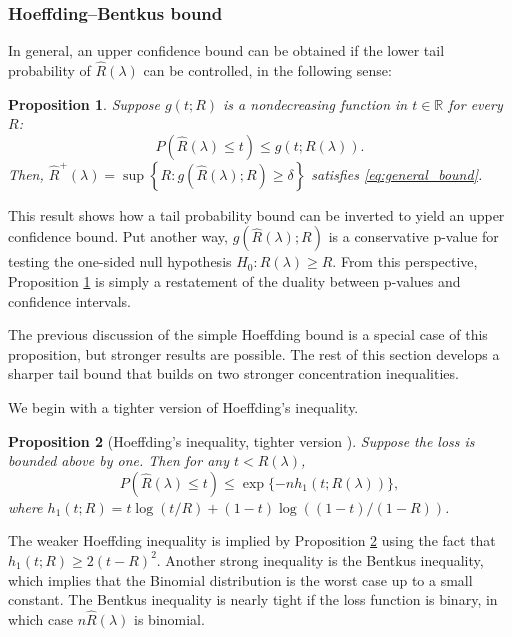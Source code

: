 \documentclass[10pt]{article}
\newtheorem{prop}{Proposition}
\newcommand{\Rhat}{\widehat{R}}
\begin{document}
\subsubsection{Hoeffding--Bentkus bound}
\label{sec:hbb}
In general, an upper confidence bound can be obtained if the lower tail probability of $\widehat{R}(\lambda)$ can be controlled, in the following sense:
\begin{prop}\label{prop:generic}
Suppose $g(t; R)$ is a nondecreasing function in $t\in \mathbb{R}$ for every $R$:
\begin{equation}\label{eq:generic}
P(\widehat{R}(\lambda)\le t)\le g(t; R(\lambda)).
\end{equation}
Then, $\widehat{R}^{+}(\lambda) = \sup\left\{R: g(\widehat{R}(\lambda); R)\ge \delta\right\}$ satisfies \eqref{eq:general_bound}.
\end{prop}
This result shows how a tail probability bound can be inverted to yield an upper confidence bound. Put another way, $g(\widehat{R}(\lambda); R)$ is a conservative p-value for testing the one-sided null hypothesis $H_0: R(\lambda)\ge R$. From this perspective, Proposition \ref{prop:generic} is simply a restatement of the duality between p-values and confidence intervals.

The previous discussion of the simple Hoeffding bound is a special case of this proposition, but stronger results are possible. The rest of this section develops a sharper tail bound that builds on two stronger concentration inequalities. 

We begin with a tighter version of Hoeffding's inequality. 
\begin{prop}[Hoeffding's inequality, tighter version \cite{hoeffding1963}]\label{prop:hoeffding}
Suppose the loss is bounded above by one. Then for any $t < R(\lambda)$,
\begin{equation}
P\left(\widehat{R}(\lambda)\le t\right) \le \exp\{-nh_1(t; R(\lambda))\},
\label{eq:hoeffding_bound_tight}
\end{equation}
where $h_1(t; R) = t \log(t / R) + (1 - t) \log((1-t) / (1- R))$.
\end{prop}
The weaker Hoeffding inequality is implied by Proposition \ref{prop:hoeffding} using the fact that $h_1(t; R)\ge 2(t - R)^2$. Another strong inequality is the Bentkus inequality, which implies that the Binomial distribution is the worst case up to a small constant.
The Bentkus inequality is nearly tight if the loss function is binary, in which case $n\Rhat(\lambda)$ is binomial. 
\end{document}
